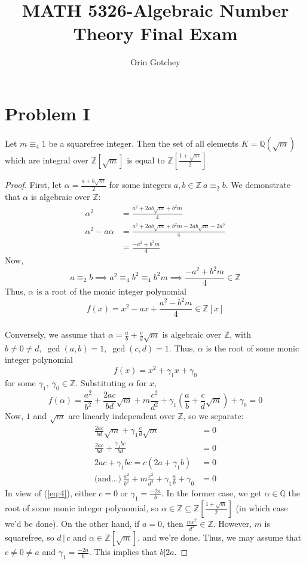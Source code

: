 \documentclass{article}
\title{MATH 5326-Algebraic Number Theory Final Exam}
\author{Orin Gotchey}
\newcommand{\Q}{\mathbb{Q}}
\newcommand{\Z}{\mathbb{Z}}
\begin{document}
\maketitle

\section*{Problem I}
Let $m\equiv_4 1$ be a squarefree integer. Then the set of all elements $K=\Q(\sqrt{m})$ which are integral over $\Z[\sqrt{m}]$ is equal to $\Z[\frac{1+\sqrt{m}}{2}]$
\begin{proof}
First, let $\alpha=\frac{a+b\sqrt{m}}{2}$ for some integers $a,b\in\Z\:a\equiv_2b$.  We demonstrate that $\alpha$ is algebraic over $\Z$: \begin{align*}
\alpha^2 &=\frac{a^2+2ab\sqrt{m}+b^2m}{4}\\
\alpha^2-a\alpha&=\frac{a^2+2ab\sqrt{m}+b^2m-2ab\sqrt{m}-2a^2}{4}\\
&=\frac{-a^2+b^2m}{4}
\end{align*}
Now, $$a\equiv_2b\implies a^2\equiv_4b^2\equiv_4 b^2m\implies \frac{-a^2+b^2m}{4}\in\Z$$ Thus, $\alpha$ is a root of the monic integer polynomial $$f(x)=x^2-ax+\frac{a^2-b^2m}{4}\in\Z[x]$$\\Conversely, we assume that $\alpha=\frac{a}{b}+\frac{c}{d}\sqrt{m}$ is algebraic over $\Z$, with $b\neq0\neq d,\;\gcd(a,b)=1,\;\gcd(c,d)=1$.  Thus, $\alpha$ is the root of some monic integer polynomial $$f(x)=x^2+\gamma_1x+\gamma_0$$
for some $\gamma_1,\:\gamma_0\in\Z$.  Substituting $\alpha$ for $x$,
\begin{equation}\label{eq1}f(\alpha)=\frac{a^2}{b^2}+\frac{2ac}{bd}\sqrt{m}+m\frac{c^2}{d^2}+\gamma_1(\frac{a}{b}+\frac{c}{d}\sqrt{m})+\gamma_0=0\end{equation}
Now, $1$ and $\sqrt{m}$ are linearly independent over $\Z$, so we separate:
\begin{align}
\label{eq:2}
\frac{2ac}{bd}\sqrt{m}+\gamma_1\frac{c}{d}\sqrt{m}&=0\\
\label{eq:3}
\frac{2ac}{bd}+\frac{\gamma_1bc}{bd}&=0\\
\label{eq:4}
2ac+\gamma_1bc=c(2a+\gamma_1b)&=0\\
\label{eq:5}
\text{(and...)}\ \frac{a^2}{b^2}+m\frac{c^2}{d^2}+\gamma_1\frac{a}{b}+\gamma_0&=0
\end{align}
In view of (\ref{eq:4}), either $c=0$ or $\gamma_1=\frac{-2a}{b}$.  In the former case, we get $\alpha\in\Q$ the root of some monic integer polynomial, so $\alpha\in\Z\subseteq\Z[\frac{1+\sqrt{m}}{2}]$ (in which case we'd be done).  On the other hand, if $a=0$, then $\frac{mc^2}{d^2}\in\Z$.  However, $m$ is squarefree, so $d\,|\,c$ and $\alpha\in\Z[\sqrt{m}]$, and we're done.  Thus, we may assume that $c\neq0\neq a$ and $\gamma_1=\frac{-2a}{b}$.  This implies that $b|2a$.  

\end{proof}
\end{document}
